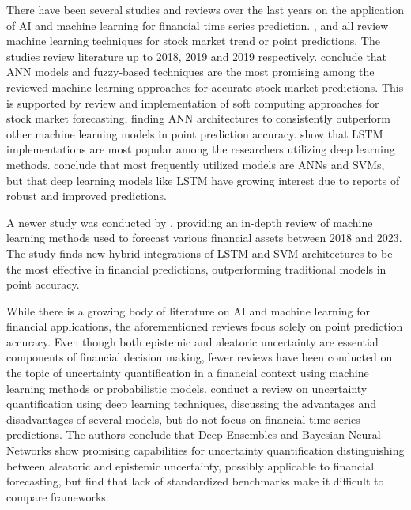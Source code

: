 There have been several studies and reviews over the last years on the application of AI and machine learning for financial time series prediction. \textcite{gandhmalstockmarket2019}, \textcite{Li2020} and \textcite{Kumbure2022} all review machine learning techniques for stock market trend or point predictions. The studies review literature up to 2018, 2019 and 2019 respectively. \textcite{gandhmalstockmarket2019} conclude that ANN models and fuzzy-based techniques are the most promising among the reviewed machine learning approaches for accurate stock market predictions. This is supported by \textcite{shi2019soft} review and implementation of soft computing approaches for stock market forecasting, finding ANN architectures to consistently outperform other machine learning models in point prediction accuracy. \textcite{Li2020} show that LSTM implementations are most popular among the researchers utilizing deep learning methods. \textcite{Kumbure2022} conclude that most frequently utilized models are ANNs and SVMs, but that deep learning models like LSTM have growing interest due to reports of robust and improved predictions. 

A newer study was conducted by \textcite{Khattak2023SurveyAIModels}, providing an in-depth review of machine learning methods used to forecast various financial assets between 2018 and 2023. The study finds new hybrid integrations of LSTM and SVM architectures to be the most effective in financial predictions, outperforming traditional models in point accuracy.

While there is a growing body of literature on AI and machine learning for financial applications, the aforementioned reviews focus solely on point prediction accuracy. Even though both epistemic and aleatoric uncertainty are essential components of financial decision making, fewer reviews have been conducted on the topic of uncertainty quantification in a financial context using machine learning methods or probabilistic models. \textcite{abdar2021ReviewUQ} conduct a review on uncertainty quantification using deep learning techniques, discussing the advantages and disadvantages of several models, but do not focus on financial time series predictions. The authors conclude that Deep Ensembles and Bayesian Neural Networks show promising capabilities for uncertainty quantification distinguishing between aleatoric and epistemic uncertainty, possibly applicable to financial forecasting, but find that lack of standardized benchmarks make it difficult to compare frameworks.

